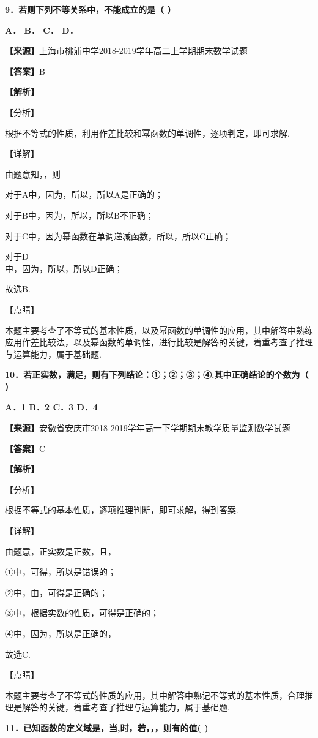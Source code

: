 \textbf{9．若则下列不等关系中，不能成立的是（ ）}

\textbf{A． B． C． D．}

\textbf{【来源】}上海市桃浦中学2018-2019学年高二上学期期末数学试题

\textbf{【答案】}B

\textbf{【解析】}

【分析】

根据不等式的性质，利用作差比较和幂函数的单调性，逐项判定，即可求解.

【详解】

由题意知，，则

对于A中，因为，所以，所以A是正确的；

对于B中，因为，所以，所以B不正确；

对于C中，因为幂函数在单调递减函数，所以，所以C正确；

对于D\\
中，因为，所以，所以D正确；

故选B.

【点睛】

本题主要考查了不等式的基本性质，以及幂函数的单调性的应用，其中解答中熟练应用作差比较法，以及幂函数的单调性，进行比较是解答的关键，着重考查了推理与运算能力，属于基础题.

\textbf{10．若正实数，满足，则有下列结论：①；②；③；④.其中正确结论的个数为（
）}

\textbf{A．1 B．2 C．3 D．4}

\textbf{【来源】}安徽省安庆市2018-2019学年高一下学期期末教学质量监测数学试题

\textbf{【答案】}C

\textbf{【解析】}

【分析】

根据不等式的基本性质，逐项推理判断，即可求解，得到答案.

【详解】

由题意，正实数是正数，且，

①中，可得，所以是错误的；

②中，由，可得是正确的；

③中，根据实数的性质，可得是正确的；

④中，因为，所以是正确的，

故选C.

【点睛】

本题主要考查了不等式的性质的应用，其中解答中熟记不等式的基本性质，合理推理是解答的关键，着重考查了推理与运算能力，属于基础题.

\textbf{11．已知函数的定义域是，当,时，若，，，则有的值( )}

